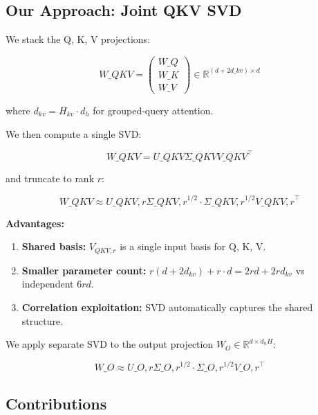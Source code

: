 \subsection{Our Approach: Joint QKV SVD}

We stack the Q, K, V projections:

\[
W\_{QKV} = \begin{pmatrix} W\_Q \\ W\_K \\ W\_V \end{pmatrix} \in \mathbb{R}^{(d + 2 d\_{kv}) \times d}
\]

where $d_{kv} = H_{kv} \cdot d_h$ for grouped-query attention.

We then compute a single SVD:

\[
W\_{QKV} = U\_{QKV} \Sigma\_{QKV} V\_{QKV}^\top
\]

and truncate to rank $r$:

\[
W\_{QKV} \approx U\_{QKV, r} \Sigma\_{QKV, r}^{1/2} \cdot \Sigma\_{QKV, r}^{1/2} V\_{QKV, r}^\top
\]

\textbf{Advantages:}

\begin{enumerate}
\item \textbf{Shared basis:} $V_{QKV, r}$ is a single input basis for Q, K, V.
\item \textbf{Smaller parameter count:} $r(d + 2d_{kv}) + r \cdot d = 2rd + 2r d_{kv}$ vs
  independent $6rd$.
\item \textbf{Correlation exploitation:} SVD automatically captures the shared
  structure.

\end{enumerate}
We apply separate SVD to the output projection $W_O \in \mathbb{R}^{d \times d_h H}$:

\[
W\_O \approx U\_{O, r} \Sigma\_{O, r}^{1/2} \cdot \Sigma\_{O, r}^{1/2} V\_{O, r}^\top
\]

\subsection{Contributions}

